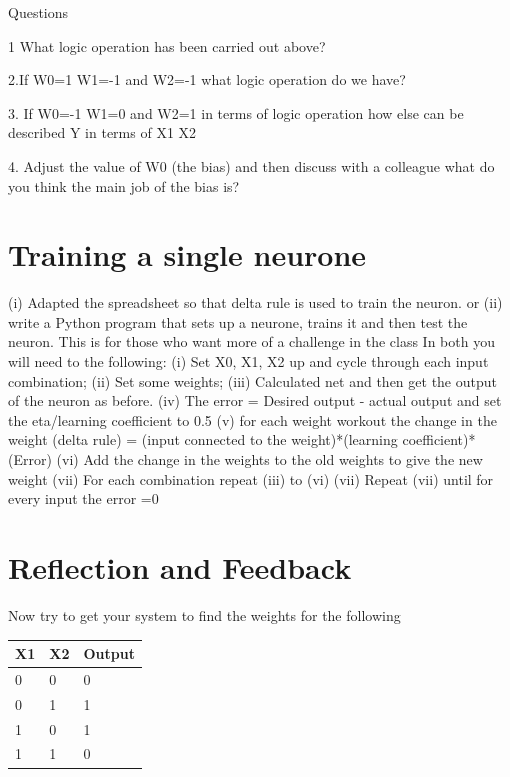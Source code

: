 \newline
Questions

1 What logic operation has been carried out above?

2.If W0=1 W1=-1 and W2=-1  what logic operation do we have?

3. If W0=-1 W1=0 and W2=1  in terms of logic operation how else can be described Y in terms of X1 X2

4. Adjust the value of W0 (the bias) and then discuss with a colleague what do you think the main job of the bias is?

\section{Training a single neurone}
(i) Adapted the spreadsheet so that delta rule is used to train the neuron.
or
\newline
(ii) write a Python program that sets up a neurone, trains it and then test the neuron.
\newline
This is for those who want more of a challenge in the class
\newline
\newline
In both you will need to the following:
\newline
(i) Set X0, X1, X2 up and cycle through each input combination;
\newline
(ii) Set some weights;
\newline
(iii) Calculated net and then get the output of the neuron as before.
\newline
(iv) The error = Desired output - actual output and set the eta/learning coefficient to 0.5
\newline
(v) for each weight workout the change in the weight (delta rule) = (input connected to the weight)*(learning coefficient)*(Error)
\newline
(vi) Add the change in the weights to the old weights to give the new weight
\newline
(vii) For each combination repeat (iii) to (vi)
\newline
(vii) Repeat (vii) until for every input the error =0 
\UrlBigBreaks{}

\section{Reflection and Feedback}
Now try to get your system to find the weights for the following

\begin{tabular}{lll} \hline
X1 & X2 & Output	 	 \\ \hline
0  & 0  & 0 \\ \hline
0  & 1	& 1 \\ \hline  
1  & 0	& 1 \\ \hline
1  & 1	& 0 \\ \hline
\end{tabular}

